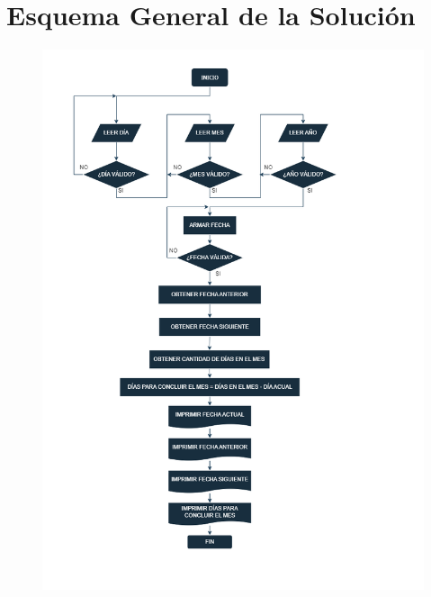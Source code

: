 \documentclass[a4paper,12pt]{article}
\begin{document}
\section{Esquema General de la Solución}
\begin{figure}[!h]
    \centering
    \includegraphics[width=\dimexpr\textwidth-4cm,height=\dimexpr\textheight-4cm]{Diagrama de Flujo del Programa.png}
\end{figure}
\newpage
\end{document}

